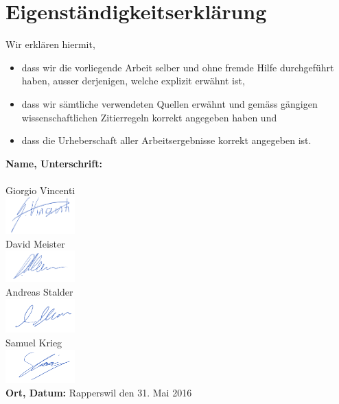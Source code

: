 \documentclass[a4,12pt]{scrartcl}
\begin{document}
\section{Eigenständigkeitserklärung}

Wir erklären hiermit, 
\begin{itemize}
\item dass wir die vorliegende Arbeit selber und ohne fremde Hilfe durchgeführt haben, ausser derjenigen, welche explizit erwähnt ist,
\item dass wir sämtliche verwendeten Quellen erwähnt und gemäss gängigen wissenschaftlichen Zitierregeln korrekt angegeben haben und
\item dass die Urheberschaft aller Arbeitsergebnisse korrekt angegeben ist.
\end{itemize}

\noindent \textbf{Name, Unterschrift:} 
\\
\\
Giorgio Vincenti\\
\includegraphics[width=0.2\textwidth]{./pictures/gv.png}\\
David Meister\\
\includegraphics[width=0.2\textwidth]{./pictures/dm.png}\\
Andreas Stalder\\
\includegraphics[width=0.2\textwidth]{./pictures/as.png}\\
Samuel Krieg\\
\includegraphics[width=0.2\textwidth]{./pictures/sk.png}\\
\textbf{Ort, Datum:} Rapperswil den 31. Mai 2016 
\end{document}
